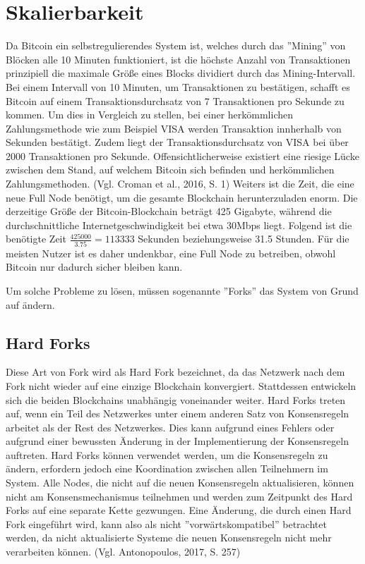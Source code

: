 \section{Skalierbarkeit}
Da Bitcoin ein selbstregulierendes System ist, welches durch das ''Mining'' von Blöcken alle 10 Minuten funktioniert, ist die
höchste Anzahl von Transaktionen prinzipiell die maximale Größe eines Blocks dividiert durch das Mining-Intervall. Bei einem
Intervall von 10 Minuten, um Transaktionen zu bestätigen, schafft es Bitcoin auf einem Transaktionsdurchsatz von 7 Transaktionen 
pro Sekunde zu kommen. Um dies in Vergleich zu stellen, bei einer herkömmlichen Zahlungsmethode wie zum Beispiel VISA werden
Transaktion innherhalb von Sekunden bestätigt. Zudem liegt der Transaktionsdurchsatz von VISA bei über 2000 Transaktionen pro
Sekunde. Offensichtlicherweise existiert eine riesige Lücke zwischen dem Stand, auf welchem Bitcoin sich befinden und
herkömmlichen Zahlungsmethoden. (Vgl. Croman et al., 2016, S. 1) Weiters ist die Zeit, die eine neue Full Node benötigt, um die gesamte 
Blockchain herunterzuladen enorm. Die derzeitige Größe der Bitcoin-Blockchain beträgt 425 Gigabyte, während die
durchschnittliche Internetgeschwindigkeit bei etwa 30Mbps liegt. Folgend ist die benötigte Zeit \(\frac{425000}{3.75} = 113333\)
Sekunden beziehungsweise 31.5 Stunden. Für die meisten Nutzer ist es daher undenkbar, eine Full Node zu betreiben, obwohl Bitcoin
nur dadurch sicher bleiben kann. 

Um solche Probleme zu lösen, müssen sogenannte ''Forks'' das System von Grund auf ändern.

\subsection{Hard Forks}
Diese Art von Fork wird als Hard Fork bezeichnet, da das Netzwerk nach dem Fork nicht wieder auf eine einzige Blockchain 
konvergiert. Stattdessen entwickeln sich die beiden Blockchains unabhängig voneinander weiter. Hard Forks treten auf, wenn ein 
Teil des Netzwerkes unter einem anderen Satz von Konsensregeln arbeitet als der Rest des Netzwerkes. Dies kann aufgrund eines
Fehlers oder aufgrund einer bewussten Änderung in der Implementierung der Konsensregeln auftreten. Hard Forks können verwendet
werden, um die Konsensregeln zu ändern, erfordern jedoch eine Koordination zwischen allen Teilnehmern im System. Alle Nodes,
die nicht auf die neuen Konsensregeln aktualisieren, können nicht am Konsensmechanismus teilnehmen und werden zum Zeitpunkt des
Hard Forks auf eine separate Kette gezwungen. Eine Änderung, die durch einen Hard Fork eingeführt wird, kann also als nicht
''vorwärtskompatibel'' betrachtet werden, da nicht aktualisierte Systeme die neuen Konsensregeln nicht mehr verarbeiten können.
(Vgl. Antonopoulos, 2017, S. 257)

